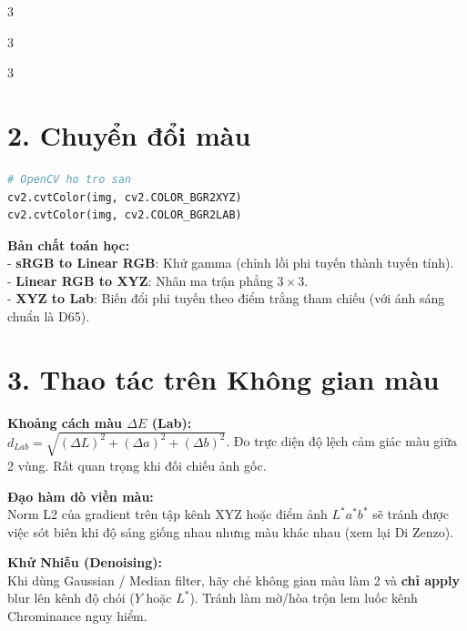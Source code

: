 \documentclass[9pt,landscape,a4paper]{extarticle}
\begin{document}
\begin{multicols*}{3}
\begin{multicols*}{3}
\begin{multicols}{3}
\section{2. Chuyển đổi màu}
\begin{lstlisting}[language=Python]
# OpenCV ho tro san
cv2.cvtColor(img, cv2.COLOR_BGR2XYZ)
cv2.cvtColor(img, cv2.COLOR_BGR2LAB)
\end{lstlisting}

\begin{tipbox}
\textbf{Bản chất toán học:}\\
- \textbf{sRGB to Linear RGB}: Khử gamma (chỉnh lồi phi tuyến thành tuyến tính).\\
- \textbf{Linear RGB to XYZ}: Nhân ma trận phẳng $3 \times 3$.\\
- \textbf{XYZ to Lab}: Biến đổi phi tuyến theo điểm trắng tham chiếu (với ánh sáng chuẩn là D65).
\end{tipbox}

\section{3. Thao tác trên Không gian màu}
\begin{infobox}
\textbf{Khoảng cách màu $\Delta E$ (Lab):}\\
$d_{Lab} = \sqrt{(\Delta L)^2 + (\Delta a)^2 + (\Delta b)^2}$. Đo trực diện độ lệch cảm giác màu giữa 2 vùng. Rất quan trọng khi đối chiếu ảnh gốc.
\end{infobox}
\begin{infobox}
\textbf{Đạo hàm dò viền màu:}\\
Norm L2 của gradient trên tập kênh XYZ hoặc điểm ảnh $L^* a^* b^*$ sẽ tránh được việc sót biên khi độ sáng giống nhau nhưng màu khác nhau (xem lại Di Zenzo).
\end{infobox}
\begin{notebox}
\textbf{Khử Nhiễu (Denoising):}\\
Khi dùng Gaussian / Median filter, hãy chẻ không gian màu làm 2 và \textbf{chỉ apply} blur lên kênh độ chói ($Y$ hoặc $L^*$). Tránh làm mờ/hòa trộn lem luốc kênh Chrominance nguy hiểm.
\end{notebox}

\end{multicols}

\end{multicols*}

\end{multicols*}
\end{document}
